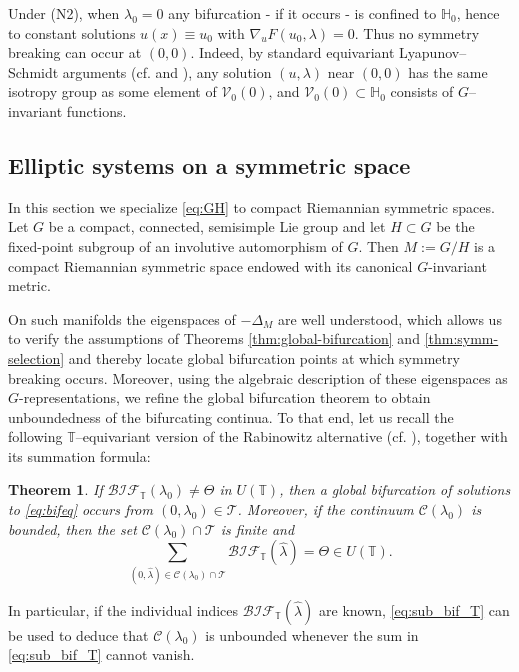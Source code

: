 \documentclass[reqno,twoside,12pt]{amsart}
\newtheorem{Theorem}[Remark]{Theorem}
\newcommand{\bH}{\mathbb{H}}
\newcommand{\bT}{\mathbb{T}}
\newcommand{\cC}{\mathcal{C}}
\newcommand{\cT}{\mathcal{T}}
\newcommand{\cV}{\mathcal{V}}
\numberwithin{equation}{section} \errorcontextlines=0
\newcommand{\bif}{\mathcal{BIF}}
\begin{document}
Under \textnormal{(N2)}, when $\lambda_{0}=0$ any bifurcation - if it occurs - is confined to $\bH_{0}$, hence to constant solutions $u(x)\equiv u_{0}$ with $\nabla_{u}F(u_{0},\lambda)=0$. Thus no symmetry breaking can occur at $(0,0)$. Indeed, by standard equivariant Lyapunov–Schmidt arguments (cf. \cite{Dancer1979} and \cite[Lemma~3.11]{GKS2018}), any solution $(u,\lambda)$ near $(0,0)$ has the same isotropy group as some element of $\cV_{0}(0)$, and $\cV_{0}(0)\subset\bH_{0}$ consists of $G$–invariant functions.

\subsection{Elliptic systems on a symmetric space}\label{subsec:unbounded}

In this section we specialize \eqref{eq:GH} to compact Riemannian symmetric spaces.
Let $G$ be a compact, connected, semisimple Lie group  and let $H\subset G$ be
the fixed-point subgroup of an involutive automorphism of $G$. Then
$M:=G/H$ is a compact Riemannian symmetric space endowed with its canonical
$G$-invariant metric.

On such manifolds the eigenspaces of $-\Delta_{M}$ are well understood, which
allows us to verify the assumptions of Theorems \ref{thm:global-bifurcation}
and \ref{thm:symm-selection} and thereby locate global bifurcation points at
which symmetry breaking occurs. Moreover, using the algebraic description of
these eigenspaces as $G$-representations,
we refine the global bifurcation theorem to obtain unboundedness of the
bifurcating continua. To that end, let us recall the following $\bT$–equivariant
version of the Rabinowitz alternative (cf. \cite[Thm.~4.9]{Ryb2005milano}),
together with its summation formula:

\begin{Theorem}\label{thm:altRab_sum_T}
If $\bif_{\bT}(\lambda_0)\neq \Theta$ in $U(\bT)$, then a global bifurcation of
solutions to \eqref{eq:bifeq} occurs from $(0,\lambda_0)\in\cT$. Moreover, if the
continuum $\cC(\lambda_0)$ is bounded, then the set $\cC(\lambda_0)\cap \cT$
is finite and
\begin{equation}\label{eq:sub_bif_T}
\sum_{(0,\widehat{\lambda})\in \cC(\lambda_0)\cap \cT}
\bif_{\bT}(\widehat{\lambda})=\Theta \in U(\bT).
\end{equation}
\end{Theorem}

In particular, if the individual indices $\bif_{\bT}(\widehat{\lambda})$
are known, \eqref{eq:sub_bif_T} can be used to deduce that $\cC(\lambda_0)$
is unbounded whenever the sum in \eqref{eq:sub_bif_T} cannot vanish.
\end{document}
